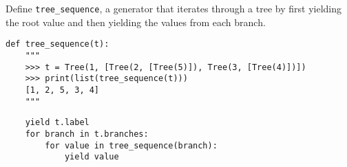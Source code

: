 \begin{blocksection}
\question Define \lstinline$tree_sequence$, a generator that iterates through a tree by first yielding the root value and then yielding the values from each branch.

\begin{lstlisting}
def tree_sequence(t):
    """
    >>> t = Tree(1, [Tree(2, [Tree(5)]), Tree(3, [Tree(4)])])
    >>> print(list(tree_sequence(t)))
    [1, 2, 5, 3, 4]
    """
\end{lstlisting}

\begin{solution}[0.5in]
\begin{lstlisting}
	yield t.label
	for branch in t.branches:
		for value in tree_sequence(branch):
			yield value
\end{lstlisting}
\end{solution}
\end{blocksection}
